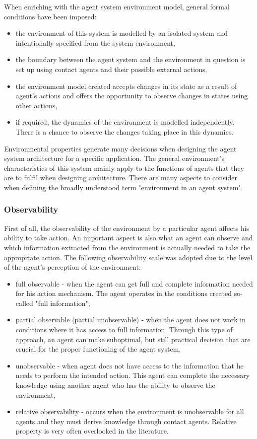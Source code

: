When enriching with the agent system environment model, general formal conditions have been imposed:
\begin{itemize}
	\item the environment of this system is modelled by an isolated system and intentionally specified from the system environment,
	\item the boundary between the agent system and the environment in question is set up using contact agents and their possible external actions,
	\item the environment model created accepts changes in its state as a result of agent's actions and offers the opportunity to observe changes in states using other actions,
	\item if required, the dynamics of the environment is modelled independently. There is a chance to observe the changes taking place in this dynamics.
\end{itemize}

Environmental properties generate many decisions when designing the agent system architecture for a specific application. The general environment's characteristics of this system mainly apply to the functions of agents that they are to fulfil when designing architecture. There are many aspects to consider when defining the broadly understood term "environment in an agent system".

\subsubsection{Observability}

First of all, the observability of the environment by a particular agent affects his ability to take action. An important aspect is also what an agent can observe and which information extracted from the environment is actually needed to take the appropriate action. The following observability scale was adopted due to the level of the agent's perception of the environment:

\begin{itemize}
	\item full observable - when the agent can get full and complete information needed for his action mechanism. The agent operates in the conditions created so-called "full information",
	\item partial observable (partial unobservable) - when the agent does not work in conditions where it has access to full information. Through this type of approach, an agent can make suboptimal, but still practical decision that are crucial for the proper functioning of the agent system,
	\item unobservable - when agent does not have access to the information that he needs to perform the intended action. This agent can complete the necessary knowledge using another agent who has the ability to observe the environment,
	\item relative observability - occurs when the environment is unobservable for all agents and they must derive knowledge through contact agents. Relative property is very often overlooked in the literature.
\end{itemize}

